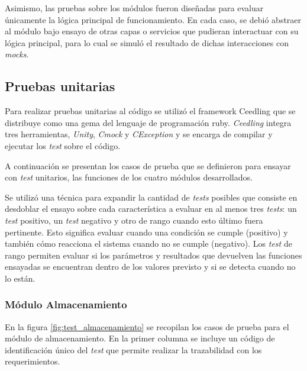Asimismo, las pruebas sobre los módulos fueron diseñadas para evaluar únicamente la lógica principal de funcionamiento.  En cada caso, se debió abstraer al módulo bajo ensayo de otras capas o servicios que pudieran interactuar con su lógica principal, para lo cual se simuló el resultado de dichas interacciones con \textit{mocks}. 


\subsection{Pruebas unitarias}
\label{subsec:unitarias}

Para realizar pruebas unitarias al código se utilizó el framework Ceedling \citep{ceedling} que se distribuye como una gema del lenguaje de programación ruby.  \textit{Ceedling} integra tres herramientas, \textit{Unity}, \textit{Cmock} y \textit{CException} y se encarga de compilar y ejecutar los \textit{test} sobre el código.

A continuación se presentan los casos de prueba que se definieron para ensayar con \textit{test} unitarios, las funciones de los cuatro módulos desarrollados.  

Se utilizó una técnica para expandir la cantidad de \textit{tests} posibles que consiste en desdoblar el ensayo sobre cada característica a evaluar en al menos tres \textit{tests}: un \textit{test} positivo, un \textit{test} negativo y otro de rango cuando esto último fuera pertinente.  Esto significa evaluar cuando una condición se cumple (positivo) y también cómo reacciona el sistema cuando no se cumple (negativo).  Los \textit{test} de rango permiten evaluar si los parámetros y resultados que devuelven las funciones ensayadas se encuentran dentro de los valores previsto y si se detecta cuando no lo están.

\subsubsection{Módulo Almacenamiento}

En la figura \ref{fig:test_almacenamiento} se recopilan los casos de prueba para el módulo de almacenamiento.  En la primer columna se incluye un código de identificación único del \textit{test} que permite realizar la trazabilidad con los requerimientos.

